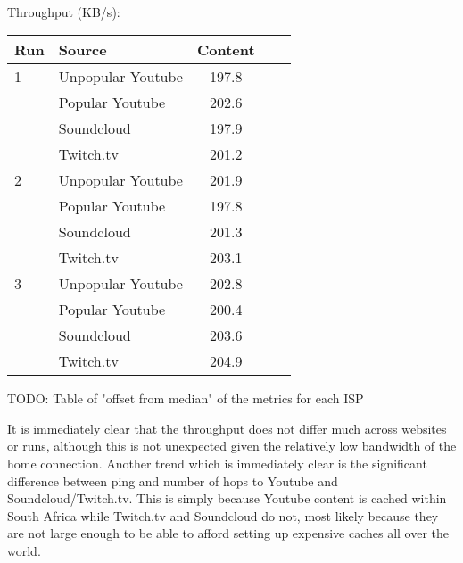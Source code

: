 \documentclass{sig-alternate-05-2015}
\begin{document}
\vspace{1em} \\
Throughput (KB/s): \\
\begin{tabular}{|l|l|c|c|c|} \hline
Run & Source & Content \\ \hline
1 & Unpopular Youtube & 197.8 \\ \hline
  & Popular Youtube   & 202.6 \\ \hline
  & Soundcloud        & 197.9 \\ \hline
  & Twitch.tv         & 201.2 \\ \hline
2 & Unpopular Youtube & 201.9 \\ \hline
  & Popular Youtube   & 197.8 \\ \hline
  & Soundcloud        & 201.3 \\ \hline
  & Twitch.tv         & 203.1 \\ \hline
3 & Unpopular Youtube & 202.8 \\ \hline
  & Popular Youtube   & 200.4 \\ \hline
  & Soundcloud        & 203.6 \\ \hline
  & Twitch.tv         & 204.9 \\ \hline
\end{tabular}

\vspace{1em}
TODO: Table of "offset from median" of the metrics for each ISP
\vspace{1em}

It is immediately clear that the throughput does not differ much across websites or runs, although this is not unexpected given the relatively low bandwidth of the home connection. Another trend which is immediately clear is the significant difference between ping and number of hops to Youtube and Soundcloud/Twitch.tv. This is simply because Youtube content is cached within South Africa while Twitch.tv and Soundcloud do not, most likely because they are not large enough to be able to afford setting up expensive caches all over the world.
\end{document}
